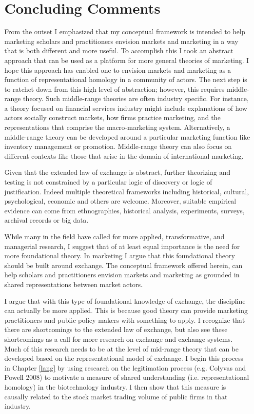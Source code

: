 \section{Concluding Comments}
From the outset I emphasized that my conceptual framework is intended to help marketing scholars and practitioners envision markets and marketing in a way that is both different and more useful. To accomplish this I took an abstract approach that can be used as a platform for more general theories of marketing. I hope this approach has enabled one to envision markets and marketing as a function of representational homology in a community of actors. The next step is to ratchet down from this high level of abstraction; however, this requires middle-range theory. Such middle-range theories are often industry specific. For instance, a theory focused on financial services industry might include explanations of how actors socially construct markets, how firms practice marketing, and the representations that comprise the macro-marketing system. Alternatively, a middle-range theory can be developed around a particular marketing function like inventory management or promotion. Middle-range theory can also focus on different contexts like those that arise in the domain of international marketing. 

Given that the extended law of exchange is abstract, further theorizing and testing is not constrained by a particular logic of discovery or logic of justification. Indeed multiple theoretical frameworks including historical, cultural, psychological, economic and others are welcome. Moreover, suitable empirical evidence can come from ethnographies, historical analysis, experiments, surveys, archival records or big data. 

While many in the field have called for more applied, transformative, and managerial research, I suggest that of at least equal importance is the need for more foundational theory. In marketing I argue that this foundational theory should be built around exchange. The conceptual framework offered herein, can help scholars and practitioners envision markets and marketing as grounded in shared representations between market actors. 
	
I argue that with this type of foundational knowledge of exchange, the discipline can actually be more applied. This is because good theory can provide marketing practitioners and public policy makers with something to apply. I recognize that there are shortcomings to the extended law of exchange, but also see these shortcomings as a call for more research on exchange and exchange systems. Much of this research needs to be at the level of mid-range theory that can be developed based on the representational model of exchange. I begin this process in Chapter \ref{lang} by using research on the legitimation process (e.g. Colyvas and Powell 2008) to motivate a measure of shared understanding (i.e. representational homology) in the biotechnology industry. I then show that this measure is causally related to the stock market trading volume of public firms in that industry.
